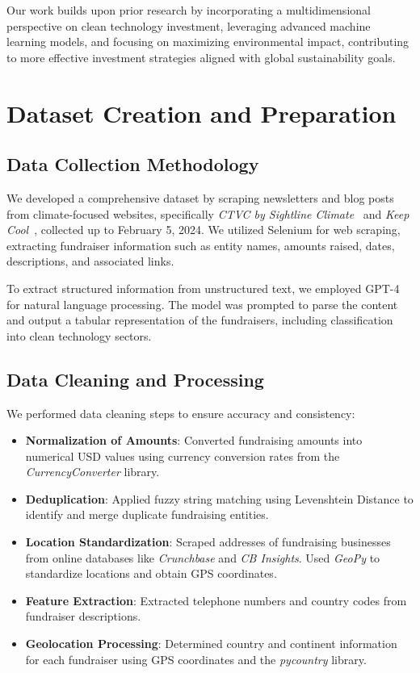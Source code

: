 \documentclass[sigconf]{acmart}
\begin{document}
Our work builds upon prior research by incorporating a multidimensional perspective on clean technology investment, leveraging advanced machine learning models, and focusing on maximizing environmental impact, contributing to more effective investment strategies aligned with global sustainability goals.

\section{Dataset Creation and Preparation}

\subsection{Data Collection Methodology}

We developed a comprehensive dataset by scraping newsletters and blog posts from climate-focused websites, specifically \textit{CTVC by Sightline Climate}~\cite{CTVC2024} and \textit{Keep Cool}~\cite{KeepCool2024}, collected up to February 5, 2024. We utilized Selenium for web scraping, extracting fundraiser information such as entity names, amounts raised, dates, descriptions, and associated links.

To extract structured information from unstructured text, we employed GPT-4 for natural language processing. The model was prompted to parse the content and output a tabular representation of the fundraisers, including classification into clean technology sectors.

\subsection{Data Cleaning and Processing}

We performed data cleaning steps to ensure accuracy and consistency:

\begin{itemize}
    \item \textbf{Normalization of Amounts}: Converted fundraising amounts into numerical USD values using currency conversion rates from the \textit{CurrencyConverter} library.
    \item \textbf{Deduplication}: Applied fuzzy string matching using Levenshtein Distance to identify and merge duplicate fundraising entities.
    \item \textbf{Location Standardization}: Scraped addresses of fundraising businesses from online databases like \textit{Crunchbase} and \textit{CB Insights}. Used \textit{GeoPy} to standardize locations and obtain GPS coordinates.
    \item \textbf{Feature Extraction}: Extracted telephone numbers and country codes from fundraiser descriptions.
    \item \textbf{Geolocation Processing}: Determined country and continent information for each fundraiser using GPS coordinates and the \textit{pycountry} library.
\end{itemize}
\end{document}
